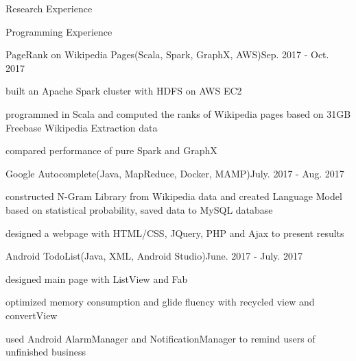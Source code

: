 \documentclass{resume} %
\begin{document}
\begin{rSection}{Research Experience}

\end{rSection}

\begin{rSection}{Programming Experience}

\begin{rSubsection}{PageRank on Wikipedia Pages(Scala, Spark, GraphX, AWS)}{Sep. 2017 - Oct. 2017}{}{}
\item built an Apache Spark cluster with HDFS on AWS EC2
\item programmed in Scala and computed the ranks of Wikipedia pages based on 31GB Freebase Wikipedia Extraction data
\item compared performance of pure Spark and GraphX
\end{rSubsection}
\begin{rSubsection}{Google Autocomplete(Java, MapReduce, Docker, MAMP)}{July. 2017 - Aug. 2017}{}{}
\item constructed N-Gram Library from Wikipedia data and created Language Model based on statistical probability, saved data to MySQL database
\item designed a webpage with HTML/CSS, JQuery, PHP and Ajax to present results
\end{rSubsection}
\begin{rSubsection}{Android TodoList(Java, XML, Android Studio)}{June. 2017 - July. 2017}{}{}
\item designed main page with ListView and Fab
\item optimized memory consumption and glide fluency with recycled view and convertView
\item used Android AlarmManager and NotificationManager to remind users of unfinished business
\end{rSubsection}





\end{rSection}
\end{document}
